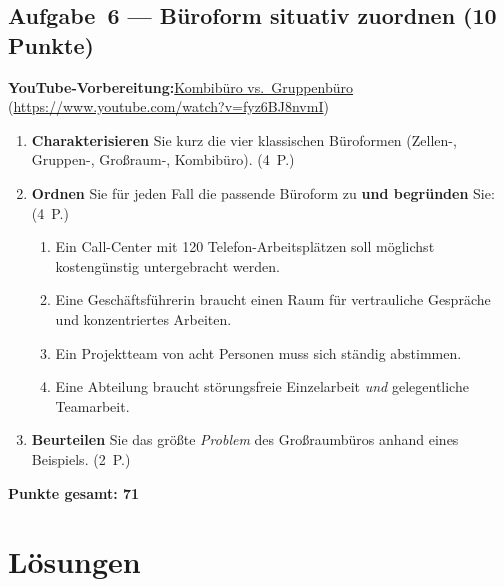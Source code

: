\documentclass[11pt, a4paper]{article}
\begin{document}
\subsection*{Aufgabe~6 --- Büroform situativ zuordnen (10 Punkte)}

\noindent\textbf{\color{bfwAccent}YouTube-Vorbereitung:}\enspace \href{https://www.youtube.com/watch?v=fyz6BJ8nvmI}{Kombibüro vs.\ Gruppenbüro} (\url{https://www.youtube.com/watch?v=fyz6BJ8nvmI})

\medskip
\begin{enumerate}[label=(\alph*)]
  \item \textbf{Charakterisieren} Sie kurz die vier klassischen Büroformen (Zellen-, Gruppen-, Großraum-, Kombibüro). \hfill (4~P.)
  \item \textbf{Ordnen} Sie für jeden Fall die passende Büroform zu \textbf{und begründen} Sie: \hfill (4~P.)
    \begin{enumerate}[label=\arabic*., leftmargin=*]
      \item Ein Call-Center mit 120 Telefon-Arbeitsplätzen soll möglichst kostengünstig untergebracht werden.
      \item Eine Geschäftsführerin braucht einen Raum für vertrauliche Gespräche und konzentriertes Arbeiten.
      \item Ein Projektteam von acht Personen muss sich ständig abstimmen.
      \item Eine Abteilung braucht störungsfreie Einzelarbeit \emph{und} gelegentliche Teamarbeit.
    \end{enumerate}
  \item \textbf{Beurteilen} Sie das größte \emph{Problem} des Großraumbüros anhand eines Beispiels. \hfill (2~P.)
\end{enumerate}

\vspace{1em}
\noindent\textbf{Punkte gesamt: 71}

\newpage

\section{Lösungen}\label{loesungen}
\end{document}
